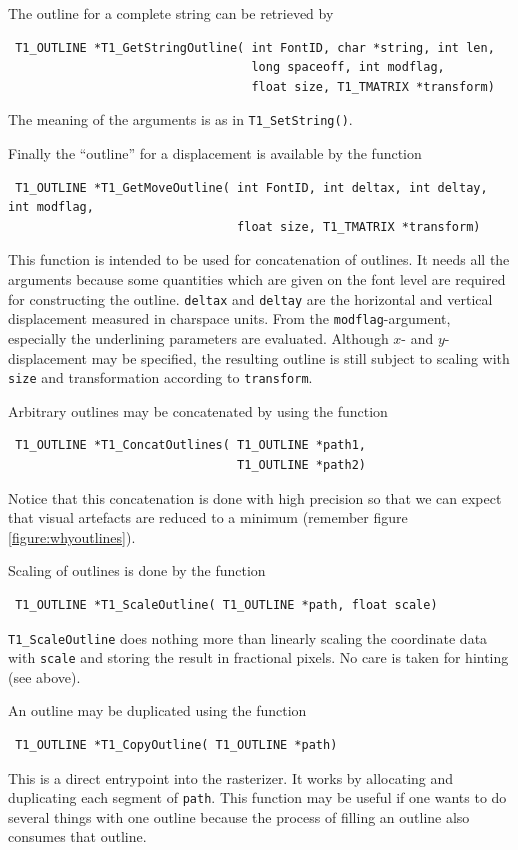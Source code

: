 The outline for a complete string can be retrieved by
\precorr
\begin{verbatim}
 T1_OUTLINE *T1_GetStringOutline( int FontID, char *string, int len, 
                                  long spaceoff, int modflag,
                                  float size, T1_TMATRIX *transform)
\end{verbatim}\postcorr
The meaning of the arguments is as in \verb+T1_SetString()+.

Finally the ``outline'' for a displacement is available by the function
\precorr
\begin{verbatim}
 T1_OUTLINE *T1_GetMoveOutline( int FontID, int deltax, int deltay, int modflag,
                                float size, T1_TMATRIX *transform)
\end{verbatim}\postcorr
This function is intended to be used for concatenation of outlines. It needs
all the arguments because some quantities which are given on the font level
are required for constructing the outline. \verb+deltax+ and \verb+deltay+ are
the horizontal and vertical displacement measured in charspace units. From the
\verb+modflag+-argument, especially the underlining parameters are
evaluated. Although $x$- and $y$-displacement may be specified, the resulting
outline is still subject to scaling with \verb+size+ and transformation
according to \verb+transform+. 

Arbitrary outlines may be concatenated by using the function
\precorr
\begin{verbatim}
 T1_OUTLINE *T1_ConcatOutlines( T1_OUTLINE *path1,
                                T1_OUTLINE *path2)
\end{verbatim}\postcorr
Notice that this concatenation is done with high precision so that we can
expect that visual artefacts are reduced to a minimum (remember figure
\ref{figure:whyoutlines}). 

Scaling of outlines is done by the function
\precorr
\begin{verbatim}
 T1_OUTLINE *T1_ScaleOutline( T1_OUTLINE *path, float scale)
\end{verbatim}\postcorr
\verb+T1_ScaleOutline+ does nothing more than linearly scaling the coordinate
data with \verb+scale+ and storing the result in fractional pixels. No care is
taken for hinting (see above).

An outline may be duplicated using the function
\precorr
\begin{verbatim}
 T1_OUTLINE *T1_CopyOutline( T1_OUTLINE *path)
\end{verbatim}\postcorr
This is a direct entrypoint into the rasterizer. It works by allocating and
duplicating each segment of \verb+path+. This function may be useful if one
wants to do several things with one outline because the process of filling an
outline also consumes that outline.

